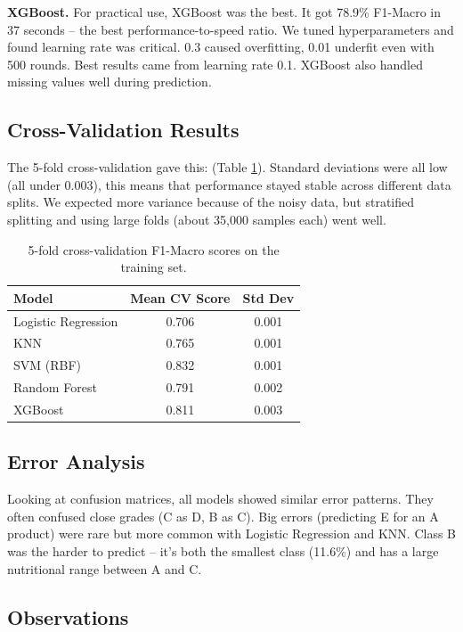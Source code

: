 \documentclass[11pt,a4paper]{article}
\begin{document}
  \textbf{XGBoost.} For practical use, XGBoost was the best. It got 78.9\% F1-Macro in 37 seconds -- the best performance-to-speed ratio. We tuned hyperparameters and found learning rate was critical. 0.3 caused overfitting, 0.01 underfit even with 500 rounds. Best results came from learning rate 0.1. XGBoost also handled missing values well during prediction.
  
  \subsection{Cross-Validation Results}
  
  The 5-fold cross-validation gave this: (Table \ref{tab:cv_results}). Standard deviations were all low (all under 0.003), this means that performance stayed stable across different data splits. We expected more variance because of the noisy data, but stratified splitting and using large folds (about 35,000 samples each) went well.
  
  \begin{table}[h]
  \centering
  \begin{tabular}{lcc}
  \toprule
  \textbf{Model} & \textbf{Mean CV Score} & \textbf{Std Dev} \\
  \midrule
  Logistic Regression & 0.706 & 0.001 \\
  KNN & 0.765 & 0.001 \\
  SVM (RBF) & 0.832 & 0.001 \\
  Random Forest & 0.791 & 0.002 \\
  XGBoost & 0.811 & 0.003 \\
  \bottomrule
  \end{tabular}
  \caption{5-fold cross-validation F1-Macro scores on the training set.}
  \label{tab:cv_results}
  \end{table}
  
  \subsection{Error Analysis}
  
  Looking at confusion matrices, all models showed similar error patterns. They often confused close grades (C as D, B as C). Big errors (predicting E for an A product) were rare but more common with Logistic Regression and KNN. Class B was the harder to predict -- it's both the smallest class (11.6\%) and has a large nutritional range between A and C.
  
  \subsection{Observations}
  
\end{document}
